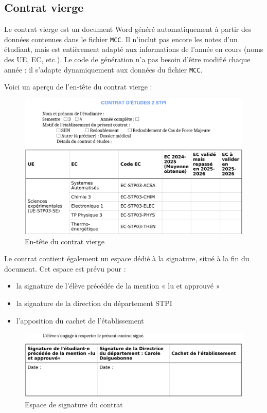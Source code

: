 \subsection{Contrat vierge }
Le contrat vierge est un document Word généré automatiquement à partir des données contenues dans le fichier \texttt{MCC}.  
Il n’inclut pas encore les notes d’un étudiant, mais est entièrement adapté aux informations de l’année en cours (noms des UE, EC, etc.).  
Le code de génération n’a pas besoin d’être modifié chaque année : il s’adapte dynamiquement aux données du fichier \texttt{MCC}.

\vspace{0.5em}
\noindent Voici un aperçu de l’en-tête du contrat vierge :

\begin{figure}[ht]
    \centering
    \includegraphics[width=\linewidth]{images/contrat_vierge.jpg}
    \caption{En-tête du contrat vierge}
    \label{contrat_vierge}
\end{figure}

\vspace{0.5em}
Le contrat contient également un espace dédié à la signature, situé à la fin du document.  
Cet espace est prévu pour :
\begin{itemize}
    \item la signature de l’élève précédée de la mention « lu et approuvé »
    \item la signature de la direction du département STPI
    \item l’apposition du cachet de l’établissement
\end{itemize}

\begin{figure}[ht]
  \centering
  \includegraphics[width=\linewidth]{images/signature.jpg}
  \caption{Espace de signature du contrat}
  \label{signature}
\end{figure}


